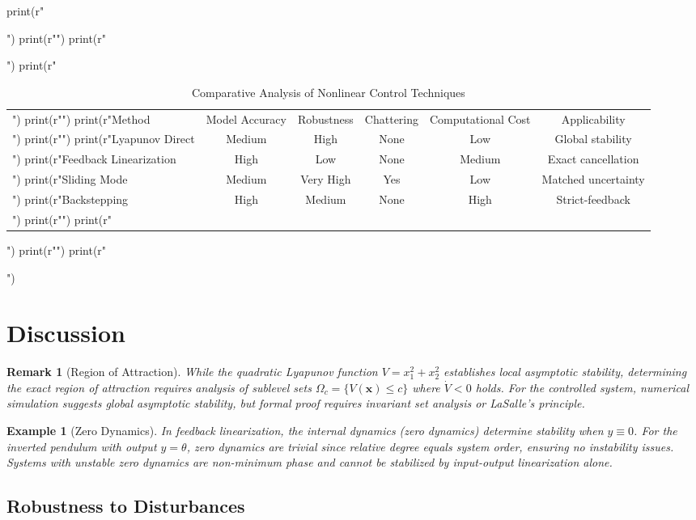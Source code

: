 \documentclass[a4paper, 11pt]{article}
\newtheorem{example}{Example}[section]
\newtheorem{remark}{Remark}[section]
\begin{document}
\begin{pycode}
print(r"\begin{table}[htbp]")
print(r"\centering")
print(r"\caption{Comparative Analysis of Nonlinear Control Techniques}")
print(r"\begin{tabular}{lccccc}")
print(r"\toprule")
print(r"Method & Model Accuracy & Robustness & Chattering & Computational Cost & Applicability \\")
print(r"\midrule")
print(r"Lyapunov Direct & Medium & High & None & Low & Global stability \\")
print(r"Feedback Linearization & High & Low & None & Medium & Exact cancellation \\")
print(r"Sliding Mode & Medium & Very High & Yes & Low & Matched uncertainty \\")
print(r"Backstepping & High & Medium & None & High & Strict-feedback \\")
print(r"\bottomrule")
print(r"\end{tabular}")
print(r"\label{tab:comparison}")
print(r"\end{table}")
\end{pycode}

\section{Discussion}

\begin{remark}[Region of Attraction]
While the quadratic Lyapunov function $V = x_1^2 + x_2^2$ establishes local asymptotic stability,
determining the exact region of attraction requires analysis of sublevel sets $\Omega_c = \{V(\mathbf{x}) \leq c\}$
where $\dot{V} < 0$ holds. For the controlled system, numerical simulation suggests global asymptotic
stability, but formal proof requires invariant set analysis or LaSalle's principle.
\end{remark}

\begin{example}[Zero Dynamics]
In feedback linearization, the internal dynamics (zero dynamics) determine stability when $y \equiv 0$.
For the inverted pendulum with output $y = \theta$, zero dynamics are trivial since relative degree
equals system order, ensuring no instability issues. Systems with unstable zero dynamics are
non-minimum phase and cannot be stabilized by input-output linearization alone.
\end{example}

\subsection{Robustness to Disturbances}
\end{document}
